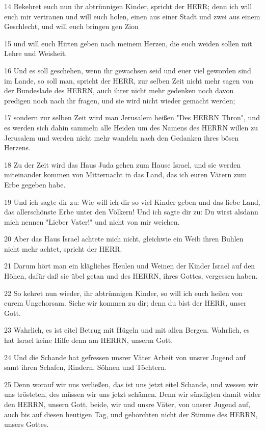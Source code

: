 \par 14 Bekehret euch nun ihr abtrünnigen Kinder, spricht der HERR; denn ich will euch mir vertrauen und will euch holen, einen aus einer Stadt und zwei aus einem Geschlecht, und will euch bringen gen Zion
\par 15 und will euch Hirten geben nach meinem Herzen, die euch weiden sollen mit Lehre und Weisheit.
\par 16 Und es soll geschehen, wenn ihr gewachsen seid und euer viel geworden sind im Lande, so soll man, spricht der HERR, zur selben Zeit nicht mehr sagen von der Bundeslade des HERRN, auch ihrer nicht mehr gedenken noch davon predigen noch nach ihr fragen, und sie wird nicht wieder gemacht werden;
\par 17 sondern zur selben Zeit wird man Jerusalem heißen "Des HERRN Thron", und es werden sich dahin sammeln alle Heiden um des Namens des HERRN willen zu Jerusalem und werden nicht mehr wandeln nach den Gedanken ihres bösen Herzens.
\par 18 Zu der Zeit wird das Haus Juda gehen zum Hause Israel, und sie werden miteinander kommen von Mitternacht in das Land, das ich euren Vätern zum Erbe gegeben habe.
\par 19 Und ich sagte dir zu: Wie will ich dir so viel Kinder geben und das liebe Land, das allerschönste Erbe unter den Völkern! Und ich sagte dir zu: Du wirst alsdann mich nennen "Lieber Vater!" und nicht von mir weichen.
\par 20 Aber das Haus Israel achtete mich nicht, gleichwie ein Weib ihren Buhlen nicht mehr achtet, spricht der HERR.
\par 21 Darum hört man ein klägliches Heulen und Weinen der Kinder Israel auf den Höhen, dafür daß sie übel getan und des HERRN, ihres Gottes, vergessen haben.
\par 22 So kehret nun wieder, ihr abtrünnigen Kinder, so will ich euch heilen von eurem Ungehorsam. Siehe wir kommen zu dir; denn du bist der HERR, unser Gott.
\par 23 Wahrlich, es ist eitel Betrug mit Hügeln und mit allen Bergen. Wahrlich, es hat Israel keine Hilfe denn am HERRN, unserm Gott.
\par 24 Und die Schande hat gefressen unsrer Väter Arbeit von unsrer Jugend auf samt ihren Schafen, Rindern, Söhnen und Töchtern.
\par 25 Denn worauf wir uns verließen, das ist uns jetzt eitel Schande, und wessen wir uns trösteten, des müssen wir uns jetzt schämen. Denn wir sündigten damit wider den HERRN, unsern Gott, beide, wir und unsre Väter, von unsrer Jugend auf, auch bis auf diesen heutigen Tag, und gehorchten nicht der Stimme des HERRN, unsers Gottes.

